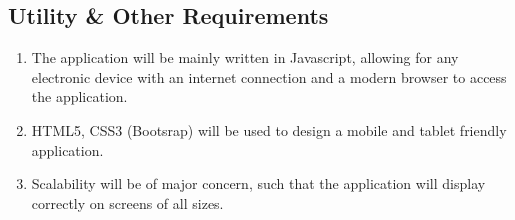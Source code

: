 \documentclass[12pt, oneside]{article}
\begin{document}
\subsection{Utility \& Other Requirements}
\begin{enumerate}[1.]
	\item The application will be mainly written in Javascript, allowing for any electronic device with an 		internet connection and a modern browser to access the application.  
	\item HTML5, CSS3 (Bootsrap) will be used to design a mobile and tablet friendly application.
	\item Scalability will be of major concern, such that the application will display correctly on screens 		of all sizes.
\end{enumerate}
\end{document}
